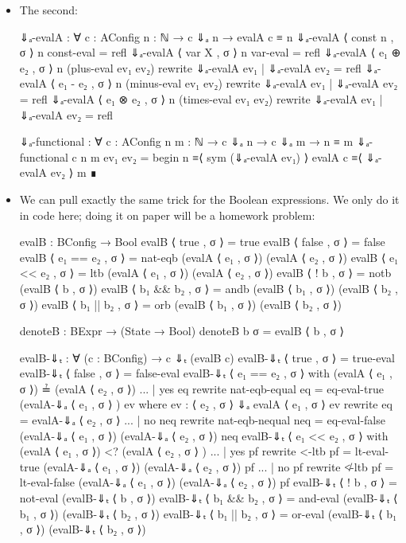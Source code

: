 \documentclass{lecturenotes}
\begin{document}
\begin{itemize}
  \begin{proof}
    We know both that $\langle e, \sigma \rangle \Downarrow n$ and $\langle e , \sigma \rangle \Downarrow \llbracket e \rrbracket(\sigma)$.
    (The second comes from AExpr Denotational Soundness.)
    But then, by the fact that $\Downarrow$ is functional, we get that $n = \llbracket e \rrbracket(\sigma)$ as desired.
  \end{proof}
\item The second:
\begin{code}
⇓ₐ-evalA : ∀ {c : AConfig} {n : ℕ} → c ⇓ₐ n → evalA c ≡ n
⇓ₐ-evalA {⟨ const n , σ ⟩} {n} const-eval = refl
⇓ₐ-evalA {⟨ var X , σ ⟩} {n} var-eval = refl
⇓ₐ-evalA {⟨ e₁ ⊕ e₂ , σ ⟩} {n} (plus-eval ev₁ ev₂)
  rewrite ⇓ₐ-evalA ev₁ | ⇓ₐ-evalA ev₂ = refl
⇓ₐ-evalA {⟨ e₁ - e₂ , σ ⟩} {n} (minus-eval ev₁ ev₂)
  rewrite ⇓ₐ-evalA ev₁ | ⇓ₐ-evalA ev₂ = refl
⇓ₐ-evalA {⟨ e₁ ⊗ e₂ , σ ⟩} {n} (times-eval ev₁ ev₂)
  rewrite ⇓ₐ-evalA ev₁ | ⇓ₐ-evalA ev₂ = refl

⇓ₐ-functional : ∀ {c : AConfig} {n m : ℕ} → c ⇓ₐ n → c ⇓ₐ m → n ≡ m
⇓ₐ-functional {c} {n} {m} ev₁ ev₂ =
  begin
    n
  ≡⟨ sym (⇓ₐ-evalA ev₁) ⟩
    evalA c
  ≡⟨ ⇓ₐ-evalA ev₂ ⟩
    m
  ∎
\end{code}
\item We can pull exactly the same trick for the Boolean expressions.
  We only do it in code here; doing it on paper will be a homework problem:
\begin{code}
evalB : BConfig → Bool
evalB ⟨ true , σ ⟩ = true
evalB ⟨ false , σ ⟩ = false
evalB ⟨ e₁ == e₂ , σ ⟩ = nat-eqb (evalA ⟨ e₁ , σ ⟩) (evalA ⟨ e₂ , σ ⟩)
evalB ⟨ e₁ << e₂ , σ ⟩ = ltb (evalA ⟨ e₁ , σ ⟩) (evalA ⟨ e₂ , σ ⟩)
evalB ⟨ ! b , σ ⟩ = notb (evalB ⟨ b , σ ⟩)
evalB ⟨ b₁ && b₂ , σ ⟩ = andb (evalB ⟨ b₁ , σ ⟩) (evalB ⟨ b₂ , σ ⟩)
evalB ⟨ b₁ || b₂ , σ ⟩ = orb (evalB ⟨ b₁ , σ ⟩) (evalB ⟨ b₂ , σ ⟩)

denoteB : BExpr → (State → Bool)
denoteB b σ = evalB ⟨ b , σ ⟩ 
\end{code}
\newpage
\begin{code}
evalB-⇓ₜ : ∀ (c : BConfig) → c ⇓ₜ (evalB c)
evalB-⇓ₜ ⟨ true , σ ⟩ = true-eval
evalB-⇓ₜ ⟨ false , σ ⟩ = false-eval
evalB-⇓ₜ ⟨ e₁ == e₂ , σ ⟩ with (evalA ⟨ e₁ , σ ⟩) ≟ (evalA ⟨ e₂ , σ ⟩)
... | yes eq rewrite nat-eqb-equal eq = eq-eval-true (evalA-⇓ₐ ⟨ e₁ , σ ⟩ ) ev
    where
      ev : ⟨ e₂ , σ ⟩ ⇓ₐ evalA ⟨ e₁ , σ ⟩
      ev rewrite eq = evalA-⇓ₐ ⟨ e₂ , σ ⟩
... | no neq rewrite nat-eqb-nequal neq = eq-eval-false (evalA-⇓ₐ ⟨ e₁ , σ ⟩) (evalA-⇓ₐ ⟨ e₂ , σ ⟩) neq
evalB-⇓ₜ ⟨ e₁ << e₂ , σ ⟩ with (evalA ⟨ e₁ , σ ⟩) <? (evalA ⟨ e₂ , σ ⟩ )
... | yes pf rewrite <-ltb pf = lt-eval-true (evalA-⇓ₐ ⟨ e₁ , σ ⟩) (evalA-⇓ₐ ⟨ e₂ , σ ⟩) pf
... | no pf rewrite ≮-ltb pf = lt-eval-false (evalA-⇓ₐ ⟨ e₁ , σ ⟩) (evalA-⇓ₐ ⟨ e₂ , σ ⟩) pf 
evalB-⇓ₜ ⟨ ! b , σ ⟩ = not-eval (evalB-⇓ₜ ⟨ b , σ ⟩) 
evalB-⇓ₜ ⟨ b₁ && b₂ , σ ⟩ = and-eval (evalB-⇓ₜ ⟨ b₁ , σ ⟩) (evalB-⇓ₜ ⟨ b₂ , σ ⟩) 
evalB-⇓ₜ ⟨ b₁ || b₂ , σ ⟩ = or-eval (evalB-⇓ₜ ⟨ b₁ , σ ⟩) (evalB-⇓ₜ ⟨ b₂ , σ ⟩)


\end{code}
\end{itemize}
\end{document}
